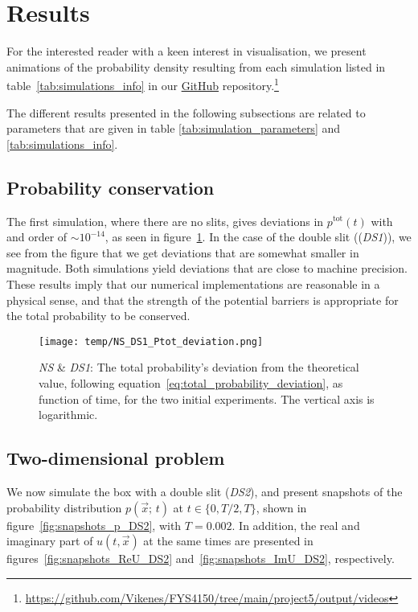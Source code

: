 \section{Results}\label{sec:results}

For the interested reader with a keen interest in visualisation, we present animations of the probability density resulting from each simulation listed in table~\ref{tab:simulations_info} in our \href{\animlink}{GitHub} repository.\footnote{\url{https://github.com/Vikenes/FYS4150/tree/main/project5/output/videos}} 

The different results presented in the following subsections are related to parameters that are given in table \ref{tab:simulation_parameters} and \ref{tab:simulations_info}.   

\subsection{Probability conservation}\label{sec:results:sanity}

    The first simulation, where there are no slits, gives deviations in $p^\mathrm{tot}(t)$ with and order of $\sim 10^{-14}$, as seen in figure~\ref{fig:ptot_deviation_NS_DS1}. In the case of the double slit ((\textit{DS1})), we see from the figure that we get deviations that are somewhat smaller in magnitude. Both simulations yield deviations that are close to machine precision. These results imply that our numerical implementations are reasonable in a physical sense, and that the strength of the potential barriers is appropriate for the total probability to be conserved.   

    \begin{figure}[ht!]
        \centering
        \texttt{[image: temp/NS\_DS1\_Ptot\_deviation.png]}
        \caption{\textit{NS} \& \textit{DS1}: The total probability's deviation from the theoretical value, following equation~\eqref{eq:total_probability_deviation}, as function of time, for the two initial experiments. The vertical axis is logarithmic.}
        \label{fig:ptot_deviation_NS_DS1}
    \end{figure}


\subsection{Two-dimensional problem}
    
    We now simulate the box with a double slit (\textit{DS2}), and present snapshots of the probability distribution $p(\vec{x};\, t)$ at $t\in\{0,T/2,T\}$, shown in figure~\ref{fig:snapshots_p_DS2}, with $T=0.002$. In addition, the real and imaginary part of $u(t, \vec{x})$ at the same times are presented in figures~\ref{fig:snapshots_ReU_DS2} and~\ref{fig:snapshots_ImU_DS2}, respectively.

